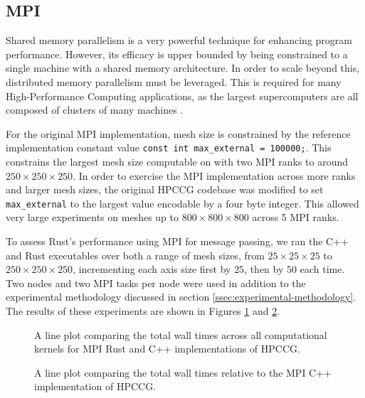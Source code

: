 \subsection{MPI}
\label{ssec:mpi}

Shared memory parallelism is a very powerful technique for enhancing program performance. However, its efficacy is upper bounded by being constrained to a single machine with a shared memory architecture. In order to scale beyond this, distributed memory parallelism must be leveraged. This is required for many High-Performance Computing applications, as the largest supercomputers are all composed of clusters of many machines \cite{HomeTOP500}.

For the original MPI implementation, mesh size is constrained by the reference implementation constant value \texttt{const int max_external = 100000;}. This constrains the largest mesh size computable on with two MPI ranks to around $250 \times 250 \times 250$. In order to exercise the MPI implementation across more ranks and larger mesh sizes, the original HPCCG codebase was modified to set \texttt{max_external} to the largest value encodable by a four byte integer. This allowed very large experiments on meshes up to $800 \times 800 \times 800$ across 5 MPI ranks.

To assess Rust's performance using MPI for message passing, we ran the C++ and Rust executables over both a range of mesh sizes, from $25 \times 25 \times 25$ to $250 \times 250 \times 250$, incrementing each axis size first by $25$, then by $50$ each time. Two nodes and two MPI tasks per node were used in addition to the experimental methodology discussed in section \ref{ssec:experimental-methodology}. The results of these experiments are shown in Figures \ref{fig:9_mpi_line} and \ref{fig:10_mpi_line_relative}.


\begin{figure}[H]
    \centering
    
    \caption{A line plot comparing the total wall times across all computational kernels for MPI Rust and C++ implementations of HPCCG.}
    \label{fig:9_mpi_line}
\end{figure}

\begin{figure}[H]
    \centering
    
    \caption{A line plot comparing the total wall times relative to the MPI C++ implementation of HPCCG.}
    \label{fig:10_mpi_line_relative}
\end{figure}

